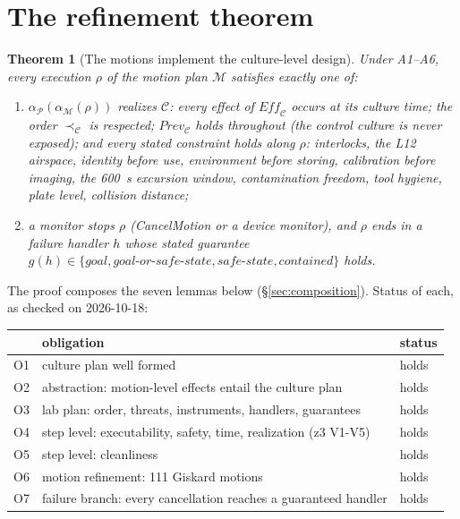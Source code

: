 \documentclass[10pt,a4paper]{article}
\theoremstyle{plain}\newtheorem{theorem}{Theorem}\newtheorem{lemma}{Lemma}\newtheorem{corollary}{Corollary}
\theoremstyle{definition}\newtheorem{definition}{Definition}\newtheorem{assumption}{Assumption}
\theoremstyle{remark}\newtheorem*{remark}{Remark}
\newcommand{\M}{\mathcal{M}}\newcommand{\Pl}{\mathcal{P}}\newcommand{\Lp}{\mathcal{L}}\newcommand{\C}{\mathcal{C}}
\begin{document}
\section{The refinement theorem}
\begin{theorem}[The motions implement the culture-level design]\label{thm:main}
Under A1--A6, every execution $\rho$ of the motion plan $\M$ satisfies exactly one of:
\begin{enumerate}[label=(\roman*)]
\item $\alpha_{\Pl}(\alpha_{\M}(\rho))$ realizes $\C$: every effect of $\mathit{Eff}_{\C}$ occurs at its culture time; the
order $\prec_{\C}$ is respected; $\mathit{Prev}_{\C}$ holds throughout (the control culture is never exposed); and every
stated constraint holds along $\rho$: interlocks, the L12 airspace, identity before use, environment before storing,
calibration before imaging, the 600~s excursion window, contamination freedom, tool hygiene, plate level, collision
distance;
\item a monitor stops $\rho$ (CancelMotion or a device monitor), and $\rho$ ends in a failure handler $h$ whose stated
guarantee $g(h) \in \{\textit{goal}, \textit{goal-or-safe-state}, \textit{safe-state}, \textit{contained}\}$ holds.
\end{enumerate}
\end{theorem}
The proof composes the seven lemmas below (\S\ref{sec:composition}). Status of each, as checked on 2026-10-18:
\begin{center}\small\begin{tabularx}{\linewidth}{@{}lXl@{}}\toprule & obligation & status \\\midrule
O1 & culture plan well formed & \textcolor{green!40!black}{holds} \\
O2 & abstraction: motion-level effects entail the culture plan & \textcolor{green!40!black}{holds} \\
O3 & lab plan: order, threats, instruments, handlers, guarantees & \textcolor{green!40!black}{holds} \\
O4 & step level: executability, safety, time, realization (z3 V1-V5) & \textcolor{green!40!black}{holds} \\
O5 & step level: cleanliness & \textcolor{green!40!black}{holds} \\
O6 & motion refinement: 111 Giskard motions & \textcolor{green!40!black}{holds} \\
O7 & failure branch: every cancellation reaches a guaranteed handler & \textcolor{green!40!black}{holds} \\\bottomrule\end{tabularx}\end{center}
\end{document}
